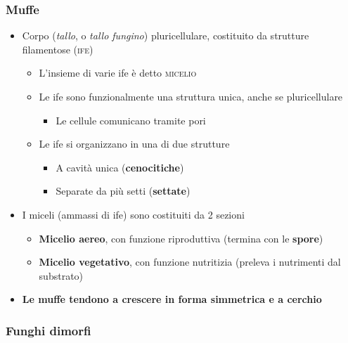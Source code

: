 \documentclass[italian,]{article}
\providecommand{\tightlist}{%
  \setlength{\itemsep}{0pt}\setlength{\parskip}{0pt}}
\begin{document}
\hypertarget{muffe}{%
\subsubsection{Muffe}\label{muffe}}

\begin{itemize}
\tightlist
\item
  Corpo (\emph{tallo}, o \emph{tallo fungino}) pluricellulare,
  costituito da strutture filamentose (\textsc{ife})

  \begin{itemize}
  \tightlist
  \item
    L'insieme di varie ife è detto \textsc{micelio}
  \item
    Le ife sono funzionalmente una struttura unica, anche se
    pluricellulare

    \begin{itemize}
    \tightlist
    \item
      Le cellule comunicano tramite pori
    \end{itemize}
  \item
    Le ife si organizzano in una di due strutture

    \begin{itemize}
    \tightlist
    \item
      A cavità unica (\textbf{cenocitiche})
    \item
      Separate da più setti (\textbf{settate})
    \end{itemize}
  \end{itemize}
\item
  I miceli (ammassi di ife) sono costituiti da 2 sezioni

  \begin{itemize}
  \tightlist
  \item
    \textbf{Micelio aereo}, con funzione riproduttiva (termina con le
    \textbf{spore})
  \item
    \textbf{Micelio vegetativo}, con funzione nutritizia (preleva i
    nutrimenti dal substrato)
  \end{itemize}
\item
  \textbf{Le muffe tendono a crescere in forma simmetrica e a cerchio}
\end{itemize}

\hypertarget{funghi-dimorfi}{%
\subsubsection{Funghi dimorfi}\label{funghi-dimorfi}}
\end{document}

